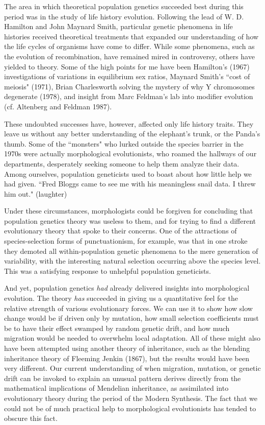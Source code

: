 \documentclass[12pt]{article}
\begin{document}
The area in which theoretical population genetics succeeded best during
this period was in the study of life history evolution.  Following the lead of
W. D. Hamilton
and John Maynard Smith, particular genetic phenomena in life histories
received theoretical treatments that expanded our understanding of
how the life cycles of organisms have come to differ.  While some phenomena,
such as the evolution of recombination, have remained mired in controversy,
others have yielded to theory.  Some of the high points for me have been
Hamilton's (1967) investigations of variations in equilibrium sex ratios,
Maynard Smith's ``cost of meiosis" (1971), Brian Charlesworth
solving the mystery of why Y chromosomes degenerate (1978), and insight from
Marc Feldman's lab into modifier evolution (cf. Altenberg and Feldman 1987).

These undoubted successes have, however, affected only life history traits.
They leave us without any better understanding of the elephant's trunk, or
the Panda's thumb.  Some of the ``monsters" who lurked outside the species
barrier in the 1970s were actually morphological evolutionists, who
roamed the hallways of our departments, desperately seeking someone to help
them analyze their data.   Among ourselves, population geneticists used to
boast about how little help we had given.  ``Fred Bloggs came to see me with
his meaningless snail data.  I threw him out." (laughter)

Under these circumstances, morphologists could be forgiven for concluding that
population genetics theory was useless to them, and for trying to find a
different evolutionary theory that spoke to their concerns.  One of the
attractions of species-selection forms of punctuationism, for example, was that
in one stroke they demoted all within-population genetic phenomena to
the mere generation of variability, with the interesting natural selection
occurring above the species level.  This was a satisfying response to
unhelpful population geneticists.

And yet, population genetics {\it had} already delivered insights into morphological
evolution.  The theory {\it has} succeeded in giving us a quantitative feel for
the relative strength of various evolutionary forces.  We can use it to show
how slow change would be if driven only by mutation, how small
selection coefficients must be to have their effect swamped by random genetic
drift, and how much migration would be needed to overwhelm local adaptation.
All of these might also have been attempted using another theory of
inheritance, such as the blending inheritance
theory of Fleeming Jenkin (1867), but the results would have been very different.
Our current understanding of when migration, mutation, or genetic drift
can be invoked to explain an unusual pattern derives directly from the
mathematical implications of Mendelian inheritance, as assimilated into 
evolutionary theory during the period of the Modern Synthesis.
The fact that we could not be of much practical help to morphological
evolutionists has tended to obscure this fact.
\end{document}
